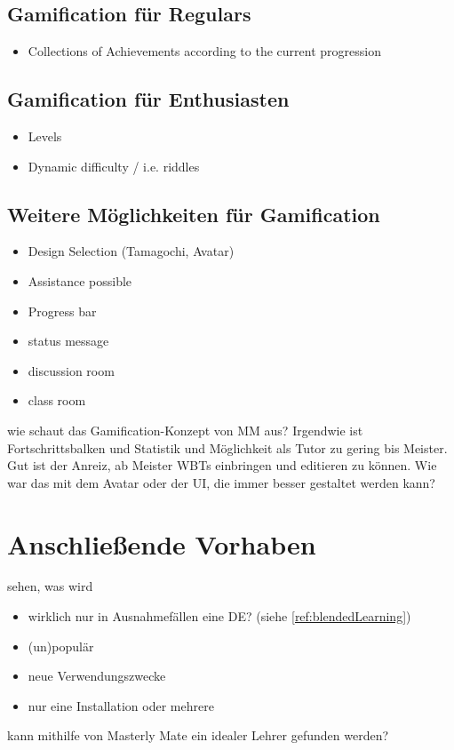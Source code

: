 \begin{k}
 \subsection{Gamification für Regulars}
 \begin{itemize}
    \item Collections of Achievements according to the current progression
  \end{itemize}
  
 \subsection{Gamification für Enthusiasten}
 \begin{itemize}
    \item Levels
    \item Dynamic difficulty / i.e. riddles
  \end{itemize}
  
 \subsection{Weitere Möglichkeiten für Gamification}
\begin{itemize}
\item Design Selection (Tamagochi, Avatar)
  \item Assistance possible
  \item Progress bar
  \item status message
  \item discussion room
  \item class room
  \end{itemize}
  
wie schaut das Gamification-Konzept von MM aus? Irgendwie ist Fortschrittsbalken
und Statistik und Möglichkeit als Tutor zu gering bis Meister. Gut ist der
Anreiz, ab Meister WBTs einbringen und editieren zu können. Wie war das mit dem
Avatar oder der UI, die immer besser gestaltet werden kann?

\end{k}

\section{Anschließende Vorhaben}\label{ref:anschlVorh}
\begin{k}
sehen, was wird
\begin{itemize}
  \item wirklich nur in Ausnahmefällen eine DE? (siehe
  \ref{ref:blendedLearning})
  \item (un)populär
  \item neue Verwendungszwecke
  \item nur eine Installation oder mehrere
\end{itemize}

kann mithilfe von Masterly Mate ein idealer Lehrer gefunden werden?
\end{k}